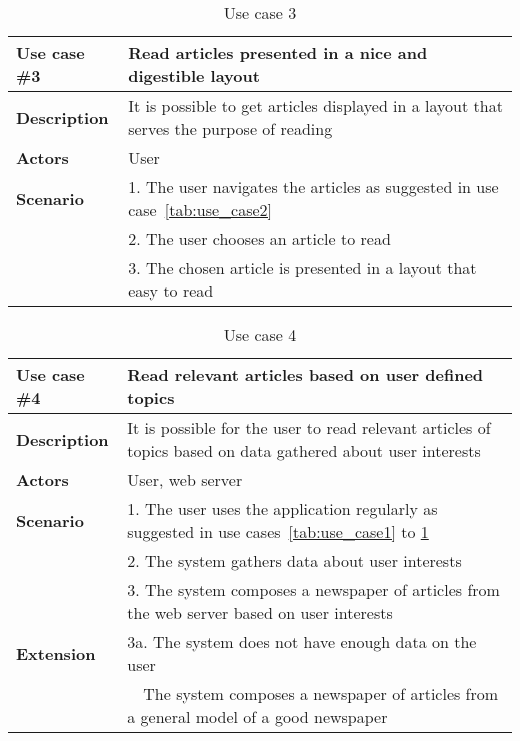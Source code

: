 \begin{table}[h!tp]
\myfloatalign
	\begin{tabular}{p{}|p{}} \toprule 
		\textbf{Use case \#3} & Read articles presented in a nice and digestible layout\\ \midrule
		\textbf{Description} & It is possible to get articles displayed in a layout that serves the purpose of reading\\ \midrule
		\textbf{Actors} & User\\ \midrule
		\textbf{Scenario} 	& 1. The user navigates the articles as suggested in use case~\ref{tab:use_case2}\\
								& 2. The user chooses an article to read\\
								& 3. The chosen article is presented in a layout that easy to read\\ \bottomrule
	\end{tabular}
\caption{Use case 3}
\label{tab:use_case3}
\end{table}

\begin{table}[h!tp]
\myfloatalign
	\begin{tabular}{p{}|p{}} \toprule 
		\textbf{Use case \#4} & Read relevant articles based on user defined topics\\ \midrule
		\textbf{Description} & It is possible for the user to read relevant articles of topics based on data gathered about user interests\\ \midrule
		\textbf{Actors} & User, web server\\ \midrule
		\textbf{Scenario} 	& 1. The user uses the application regularly as suggested in use cases~\ref{tab:use_case1} to \ref{tab:use_case3}\\
								& 2. The system gathers data about user interests\\
								& 3. The system composes a newspaper of articles from the web server based on user interests\\ \midrule
		\textbf{Extension}	& 3a. The system does not have enough data on the user\\
										& \ \ The system composes a newspaper of articles from a general model of a good newspaper\\
										 \bottomrule
	\end{tabular}
\caption{Use case 4}
\label{tab:use_case4}
\end{table}

